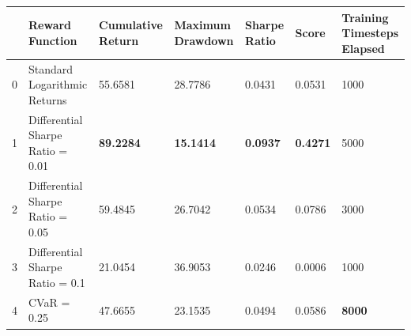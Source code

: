 \begin{tabular}{lllllll}
\toprule
 & Reward Function & Cumulative Return & Maximum Drawdown & Sharpe Ratio & Score & Training Timesteps Elapsed \\
\midrule
0 & Standard Logarithmic Returns & 55.6581 & 28.7786 & 0.0431 & 0.0531 & 1000 \\
1 & Differential Sharpe Ratio = 0.01 & \textbf{89.2284} & \textbf{15.1414} & \textbf{0.0937} & \textbf{0.4271} & 5000 \\
2 & Differential Sharpe Ratio = 0.05 & 59.4845 & 26.7042 & 0.0534 & 0.0786 & 3000 \\
3 & Differential Sharpe Ratio = 0.1 & 21.0454 & 36.9053 & 0.0246 & 0.0006 & 1000 \\
4 & CVaR = 0.25 & 47.6655 & 23.1535 & 0.0494 & 0.0586 & \textbf{8000} \\
\bottomrule
\end{tabular}
